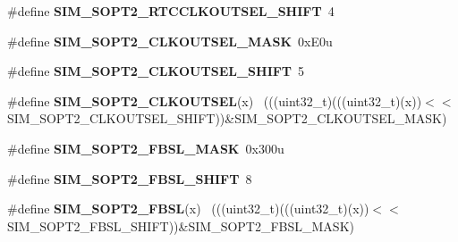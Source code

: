 \begin{DoxyCompactItemize}
\item 
\hypertarget{group___s_i_m___register___masks_gaa4b7f7e8f1999ec0d56a1224cf7eb35d}{}\#define {\bfseries S\+I\+M\+\_\+\+S\+O\+P\+T2\+\_\+\+R\+T\+C\+C\+L\+K\+O\+U\+T\+S\+E\+L\+\_\+\+S\+H\+I\+F\+T}~4\label{group___s_i_m___register___masks_gaa4b7f7e8f1999ec0d56a1224cf7eb35d}

\item 
\hypertarget{group___s_i_m___register___masks_ga601bb7007f58e3ad5433d3538f4dcef0}{}\#define {\bfseries S\+I\+M\+\_\+\+S\+O\+P\+T2\+\_\+\+C\+L\+K\+O\+U\+T\+S\+E\+L\+\_\+\+M\+A\+S\+K}~0x\+E0u\label{group___s_i_m___register___masks_ga601bb7007f58e3ad5433d3538f4dcef0}

\item 
\hypertarget{group___s_i_m___register___masks_ga520c9a255ff79372237f5f332f749112}{}\#define {\bfseries S\+I\+M\+\_\+\+S\+O\+P\+T2\+\_\+\+C\+L\+K\+O\+U\+T\+S\+E\+L\+\_\+\+S\+H\+I\+F\+T}~5\label{group___s_i_m___register___masks_ga520c9a255ff79372237f5f332f749112}

\item 
\hypertarget{group___s_i_m___register___masks_ga7faedd289e00fe163a5dc4f22b9fa3fb}{}\#define {\bfseries S\+I\+M\+\_\+\+S\+O\+P\+T2\+\_\+\+C\+L\+K\+O\+U\+T\+S\+E\+L}(x)                                  ~(((uint32\+\_\+t)(((uint32\+\_\+t)(x))$<$$<$S\+I\+M\+\_\+\+S\+O\+P\+T2\+\_\+\+C\+L\+K\+O\+U\+T\+S\+E\+L\+\_\+\+S\+H\+I\+F\+T))\&S\+I\+M\+\_\+\+S\+O\+P\+T2\+\_\+\+C\+L\+K\+O\+U\+T\+S\+E\+L\+\_\+\+M\+A\+S\+K)\label{group___s_i_m___register___masks_ga7faedd289e00fe163a5dc4f22b9fa3fb}

\item 
\hypertarget{group___s_i_m___register___masks_ga27b0cb220aaf94e8d04795bd682ebd78}{}\#define {\bfseries S\+I\+M\+\_\+\+S\+O\+P\+T2\+\_\+\+F\+B\+S\+L\+\_\+\+M\+A\+S\+K}~0x300u\label{group___s_i_m___register___masks_ga27b0cb220aaf94e8d04795bd682ebd78}

\item 
\hypertarget{group___s_i_m___register___masks_ga7077057e2a7f0841d8151d2703d85f16}{}\#define {\bfseries S\+I\+M\+\_\+\+S\+O\+P\+T2\+\_\+\+F\+B\+S\+L\+\_\+\+S\+H\+I\+F\+T}~8\label{group___s_i_m___register___masks_ga7077057e2a7f0841d8151d2703d85f16}

\item 
\hypertarget{group___s_i_m___register___masks_ga7bb05630a58acb5628192ffdb8207295}{}\#define {\bfseries S\+I\+M\+\_\+\+S\+O\+P\+T2\+\_\+\+F\+B\+S\+L}(x)                                            ~(((uint32\+\_\+t)(((uint32\+\_\+t)(x))$<$$<$S\+I\+M\+\_\+\+S\+O\+P\+T2\+\_\+\+F\+B\+S\+L\+\_\+\+S\+H\+I\+F\+T))\&S\+I\+M\+\_\+\+S\+O\+P\+T2\+\_\+\+F\+B\+S\+L\+\_\+\+M\+A\+S\+K)\label{group___s_i_m___register___masks_ga7bb05630a58acb5628192ffdb8207295}


\end{DoxyCompactItemize}
